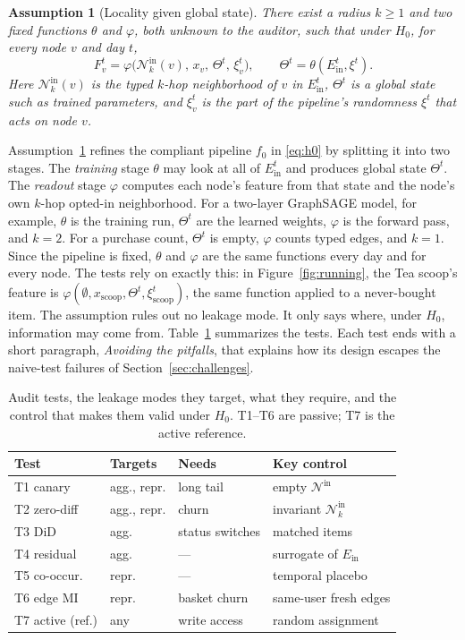 \documentclass[10pt,twocolumn,letterpaper]{article}
\newtheorem{assumption}{Assumption}
\theoremstyle{definition}
\newcommand{\Ein}{E_{\mathrm{in}}}
\newcommand{\N}{\mathcal{N}}
\begin{document}
\begin{assumption}[Locality given global state]\label{ass:local}
There exist a radius $k\ge 1$ and two fixed functions $\theta$ and $\varphi$,
both unknown to the auditor, such that under $H_0$, for every node $v$ and day
$t$,
\begin{equation}
  F_v^t=\varphi\big(\N_k^{\mathrm{in}}(v),\, x_v,\, \Theta^t,\, \xi_v^t\big),
  \qquad \Theta^t=\theta(\Ein^t,\xi^t).
  \label{eq:local}
\end{equation}
Here $\N_k^{\mathrm{in}}(v)$ is the typed $k$-hop neighborhood of $v$ in $\Ein^t$,
$\Theta^t$ is a global state such as trained parameters, and $\xi_v^t$ is the
part of the pipeline's randomness $\xi^t$ that acts on node $v$.
\end{assumption}

Assumption~\ref{ass:local} refines the compliant pipeline $f_0$ in
\eqref{eq:h0} by splitting it into two stages. The \emph{training} stage
$\theta$ may look at all of $\Ein^t$ and produces global state $\Theta^t$. The
\emph{readout} stage $\varphi$ computes each node's feature from that state and
the node's own $k$-hop opted-in neighborhood. For a two-layer GraphSAGE model,
for example, $\theta$ is the training run, $\Theta^t$ are the learned weights,
$\varphi$ is the forward pass, and $k=2$. For a purchase count, $\Theta^t$ is
empty, $\varphi$ counts typed edges, and $k=1$. Since the pipeline is fixed,
$\theta$ and $\varphi$ are the same functions every day and for every node. The
tests rely on exactly this: in Figure~\ref{fig:running}, the Tea scoop's
feature is $\varphi(\emptyset, x_{\text{scoop}}, \Theta^t, \xi^t_{\text{scoop}})$,
the same function applied to a never-bought item. The assumption rules out no
leakage mode. It only says where, under $H_0$, information may come from.
Table~\ref{tab:tests} summarizes the tests. Each test ends with a short
paragraph, \emph{Avoiding the pitfalls}, that explains how its design escapes
the naive-test failures of Section~\ref{sec:challenges}.

\begin{table}[t]
\centering\small
\setlength{\tabcolsep}{3pt}
\begin{tabular}{@{}llll@{}}
\toprule
Test & Targets & Needs & Key control \\
\midrule
T1 canary & agg., repr. & long tail & empty $\N^{\mathrm{in}}$ \\
T2 zero-diff & agg., repr. & churn & invariant $\N_k^{\mathrm{in}}$ \\
T3 DiD & agg. & status switches & matched items \\
T4 residual & agg. & --- & surrogate of $\Ein$ \\
T5 co-occur. & repr. & --- & temporal placebo \\
T6 edge MI & repr. & basket churn & same-user fresh edges \\
T7 active (ref.) & any & write access & random assignment \\
\bottomrule
\end{tabular}
\caption{Audit tests, the leakage modes they target, what they require, and the control that makes them valid under $H_0$. T1--T6 are passive; T7 is the active reference.}
\label{tab:tests}
\end{table}
\end{document}
